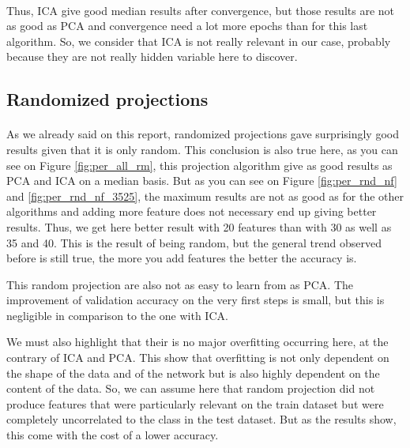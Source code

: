 \documentclass[twocolumn,a4paper,10pt]{article}
\begin{document}
\paragraph{}

Thus, ICA give good median results after convergence, but those results
are not as good as PCA and convergence need a lot more epochs than
for this last algorithm. So, we consider that ICA is not really relevant
in our case, probably because they are not really hidden variable
here to discover.

\subsection{Randomized projections}

\label{nn_rnd} 

\paragraph{}

As we already said on this report, randomized projections gave surprisingly
good results given that it is only random. This conclusion is also
true here, as you can see on Figure \ref{fig:per_all_rm}, this projection
algorithm give as good results as PCA and ICA on a median basis. But
as you can see on Figure \ref{fig:per_rnd_nf} and \ref{fig:per_rnd_nf_3525},
the maximum results are not as good as for the other algorithms and
adding more feature does not necessary end up giving better results.
Thus, we get here better result with 20 features than with 30 as well
as 35 and 40. This is the result of being random, but the general
trend observed before is still true, the more you add features the
better the accuracy is.

This random projection are also not as easy to learn from as PCA.
The improvement of validation accuracy on the very first steps is
small, but this is negligible in comparison to the one with ICA.

We must also highlight that their is no major overfitting occurring
here, at the contrary of ICA and PCA. This show that overfitting is
not only dependent on the shape of the data and of the network but
is also highly dependent on the content of the data. So, we can assume
here that random projection did not produce features that were particularly
relevant on the train dataset but were completely uncorrelated to
the class in the test dataset. But as the results show, this come
with the cost of a lower accuracy.
\end{document}
